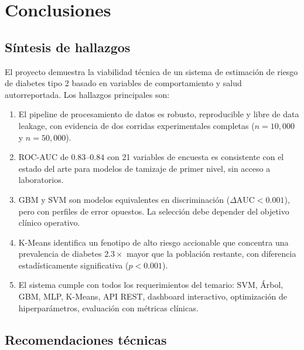 \documentclass[12pt,a4paper]{article}
\begin{document}
\section{Conclusiones}

\subsection{Síntesis de hallazgos}

El proyecto demuestra la viabilidad técnica de un sistema de estimación de riesgo de diabetes tipo 2 basado en variables de comportamiento y salud autorreportada. Los hallazgos principales son:

\begin{enumerate}
  \item El pipeline de procesamiento de datos es robusto, reproducible y libre de data leakage, con evidencia de dos corridas experimentales completas ($n=10{,}000$ y $n=50{,}000$).
  \item ROC-AUC de $0.83$--$0.84$ con 21 variables de encuesta es consistente con el estado del arte para modelos de tamizaje de primer nivel, sin acceso a laboratorios.
  \item GBM y SVM son modelos equivalentes en discriminación ($\Delta\text{AUC}<0.001$), pero con perfiles de error opuestos. La selección debe depender del objetivo clínico operativo.
  \item K-Means identifica un fenotipo de alto riesgo accionable que concentra una prevalencia de diabetes $2.3\times$ mayor que la población restante, con diferencia estadísticamente significativa ($p<0.001$).
  \item El sistema cumple con todos los requerimientos del temario: SVM, Árbol, GBM, MLP, K-Means, API REST, dashboard interactivo, optimización de hiperparámetros, evaluación con métricas clínicas.
\end{enumerate}

\subsection{Recomendaciones técnicas}
\end{document}
